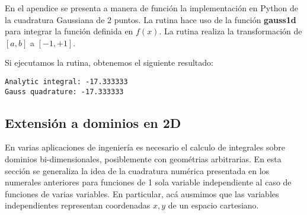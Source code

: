 En el apendice se presenta a manera de función la implementación en Python de la cuadratura Gaussiana de 2 puntos. La rutina hace uso  de la función {\bf gauss1d} para integrar la función definida en {\bf $f(x)$}. La rutina realiza la transformación de $[a,b]$ a $[-1, +1]$.

%    
%    
%    
%    
%    
%

Si ejecutamos la rutina, obtenemos el siguiente resultado:
\begin{verbatim}
Analytic integral: -17.333333
Gauss quadrature: -17.333333
\end{verbatim}

\subsection{Extensión a dominios en 2D}
En varias aplicaciones de ingeniería es necesario el calculo de integrales sobre dominios bi-dimensionales, posiblemente con geométrias arbitrarias. En esta sección se generaliza la idea de la cuadratura numérica presentada en los numerales anteriores para funciones de 1 sola variable independiente al caso de funciones de varias variables. En particular, acá ausmimos que las variables independientes representan coordenadas $x , y$ de un espacio cartesiano.

